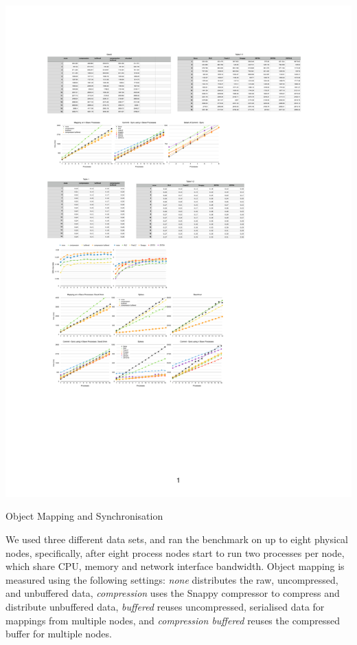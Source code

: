 \begin{benchmark}[h!t]
  \includegraphics[width=\textwidth]{results/mapping}
  \caption{\label{rMapping}Object Mapping and Synchronisation}
\end{benchmark}

We used three different data sets, and ran the benchmark on up to eight
physical nodes, specifically, after eight process nodes start to run two processes
per node, which share CPU, memory and network interface bandwidth. Object
mapping is measured using the following settings: {\em none} distributes the
raw, uncompressed, and unbuffered data, {\em compression} uses the Snappy
compressor to compress and distribute unbuffered data, {\em buffered} reuses
uncompressed, serialised data for mappings from multiple nodes, and
{\em compression buffered} reuses the compressed buffer for multiple nodes.

